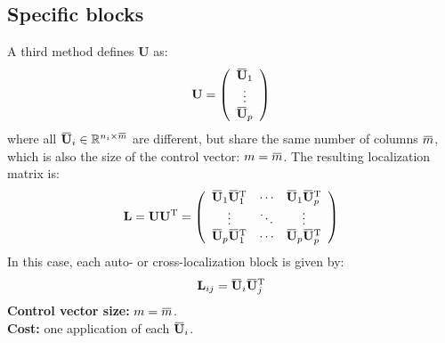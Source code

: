 \documentclass[12pt]{scrartcl}
\newcommand{\overbar}[1]{\mkern 1.5mu\overline{\mkern-1.5mu#1\mkern-1.5mu}\mkern 1.5mu}
\begin{document}
\subsection{Specific blocks}
A third method defines $\mathbf{U}$ as:
\begin{align}
\mathbf{U} = \left( \begin{array}{c}
\overbar{\mathbf{U}}_1 \\
\vdots \\
\overbar{\mathbf{U}}_p
\end{array} \right)
\end{align}
where all $\overbar{\mathbf{U}}_i \in \mathbb{R}^{n_i \times \overbar{m}}$ are different, but share the same number of columns $\overbar{m}$, which is also the size of the control vector: $m = \overbar{m}$. The resulting localization matrix is:
\begin{align}
\mathbf{L} = \mathbf{U} \mathbf{U}^\mathrm{T} = \left( \begin{array}{ccc}
\overbar{\mathbf{U}}_1 \overbar{\mathbf{U}}_1^\mathrm{T} & \cdots & \overbar{\mathbf{U}}_1 \overbar{\mathbf{U}}_p^\mathrm{T} \\
\vdots & \ddots & \vdots  \\
\overbar{\mathbf{U}}_p \overbar{\mathbf{U}}_1^\mathrm{T} & \cdots & \overbar{\mathbf{U}}_p \overbar{\mathbf{U}}_p^\mathrm{T}
\end{array} \right)
\end{align}
In this case, each auto- or cross-localization block is given by: 
\begin{align}
\mathbf{L}_{ij} = \overbar{\mathbf{U}}_i \overbar{\mathbf{U}}_j^\mathrm{T}
\end{align}
\textbf{Control vector size:} $\displaystyle m = \overbar{m}$.\\
\textbf{Cost:} one application of each $\overbar{\mathbf{U}}_i$.
\end{document}
